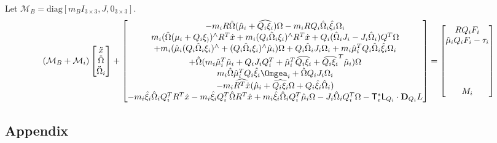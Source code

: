 \documentclass[10pt]{article}
\newcommand{\T}{\ensuremath{\mathsf{T}}}
\renewcommand{\L}{\ensuremath{\mathsf{L}}}
\newcommand{\D}{\ensuremath{\mathbf{D}}}
\begin{document}
Let $\mathcal{M}_B = \mathrm{diag}[m_B I_{3\times 3}, J, 0_{3\times 3}]$.
\begin{gather*}
    ( \mathcal{M}_B + \mathcal{M}_i )
    \begin{bmatrix} \ddot x \\ \ddot\Omega \\ \ddot\Omega_i \end{bmatrix}
    +
    \begin{bmatrix}
        -m_i R\hat\Omega(\hat\mu_i +\widehat{Q_i\xi_i})\Omega - m_i R Q_i\hat\Omega_i\hat\xi_i \Omega_i \\
        m_i(\hat\Omega(\mu_i + Q_i\xi_))^\wedge R^T\dot x + m_i (Q_i\hat\Omega_i\xi_i)^\wedge R^T \dot x + Q_i(\hat\Omega_i J_i - J_i\hat\Omega_i) Q^T \Omega \\ 
        + m_i(\hat\mu_i(Q_i\hat\Omega_i\xi_i)^\wedge + (Q_i\hat\Omega_i \xi_i)^\wedge \hat\mu_i)\Omega + Q_i\hat\Omega_i J_i\Omega_i + m_i\hat\mu_i^T Q_i\hat\Omega_i \hat\xi_i \Omega_i \\
        + \hat\Omega( m_i\hat\mu_i^T\hat\mu_i + Q_i J_i Q_i^T + \hat\mu_i^T \widehat{Q_i\xi_i} + \widehat{Q_i\xi_i}^T\hat\mu_i )\Omega \\
        m_i\hat\Omega \hat\mu_i^T Q_i \hat\xi_i \Omgea_i + \hat\Omega Q_i J_i \Omega_i\\
        - m_i \widehat{R^T \dot x} (\hat\mu_i+\widehat{Q_i\xi_i} \Omega +  Q_i \hat \xi_i \hat\Omega_i ) \\
        -m_i \hat\xi_i \hat\Omega_i Q_i^T R^T \dot x - m_i\hat\xi_i Q_i^T \hat\Omega R^T \dot x + m_i \hat\xi_i\hat\Omega_i Q_i^T \hat\mu_i \Omega - J_i\hat\Omega_i Q_i^T \Omega -\T_e^* \L_{Q_i} \cdot \D_{Q_i} L 
    \end{bmatrix}
    =
    \begin{bmatrix}
        R Q_i F_i \\
        \hat \mu_i Q_i F_i - \tau_i \\
        \\ \\ \\ \\
        M_i
    \end{bmatrix}
\end{gather*}



\appendix

\subsection*{Appendix}
\end{document}
